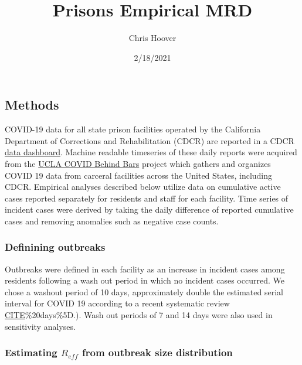 \documentclass[
]{article}
\title{Prisons Empirical MRD}
\author{Chris Hoover}
\date{2/18/2021}
\begin{document}
\maketitle

\hypertarget{methods}{%
\subsection{Methods}\label{methods}}

COVID-19 data for all state prison facilities operated by the California
Department of Corrections and Rehabilitation (CDCR) are reported in a
CDCR
\href{https://www.cdcr.ca.gov/covid19/population-status-tracking/}{data
dashboard}. Machine readable timeseries of these daily reports were
acquired from the
\href{https://github.com/uclalawcovid19behindbars}{UCLA COVID Behind
Bars} project which gathers and organizes COVID 19 data from carceral
facilities across the United States, including CDCR. Empirical analyses
described below utilize data on cumulative active cases reported
separately for residents and staff for each facility. Time series of
incident cases were derived by taking the daily difference of reported
cumulative cases and removing anomalies such as negative case counts.

\hypertarget{definining-outbreaks}{%
\subsubsection{Definining outbreaks}\label{definining-outbreaks}}

Outbreaks were defined in each facility as an increase in incident cases
among residents following a wash out period in which no incident cases
occurred. We chose a washout period of 10 days, approximately double the
estimated serial interval for COVID 19 according to a recent systematic
review
\href{https://www.ncbi.nlm.nih.gov/pmc/articles/PMC7448781/\#:~:text=The\%20pooled\%20estimate\%20of\%20serial,SD\%20\%3D\%203.8}{CITE}\%20days\%5D.).
Wash out periods of 7 and 14 days were also used in sensitivity
analyses.

\hypertarget{estimating-r_eff-from-outbreak-size-distribution}{%
\subsubsection{\texorpdfstring{Estimating \(R_{eff}\) from outbreak size
distribution}{Estimating R\_\{eff\} from outbreak size distribution}}\label{estimating-r_eff-from-outbreak-size-distribution}}
\end{document}
